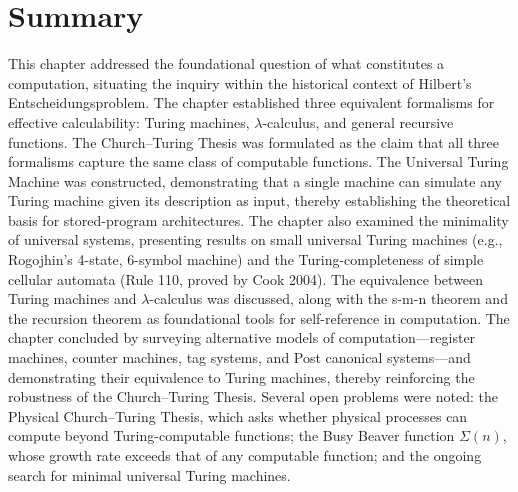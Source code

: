 \section{Summary}
\label{sec:computation:summary}

This chapter addressed the foundational question of what constitutes a computation, situating the inquiry within the historical context of Hilbert's Entscheidungsproblem. The chapter established three equivalent formalisms for effective calculability: Turing machines, $\lambda$-calculus, and general recursive functions. The Church--Turing Thesis was formulated as the claim that all three formalisms capture the same class of computable functions. The Universal Turing Machine was constructed, demonstrating that a single machine can simulate any Turing machine given its description as input, thereby establishing the theoretical basis for stored-program architectures. The chapter also examined the minimality of universal systems, presenting results on small universal Turing machines (e.g., Rogojhin's 4-state, 6-symbol machine) and the Turing-completeness of simple cellular automata (Rule 110, proved by Cook 2004). The equivalence between Turing machines and $\lambda$-calculus was discussed, along with the s-m-n theorem and the recursion theorem as foundational tools for self-reference in computation. The chapter concluded by surveying alternative models of computation---register machines, counter machines, tag systems, and Post canonical systems---and demonstrating their equivalence to Turing machines, thereby reinforcing the robustness of the Church--Turing Thesis. Several open problems were noted: the Physical Church--Turing Thesis, which asks whether physical processes can compute beyond Turing-computable functions; the Busy Beaver function $\Sigma(n)$, whose growth rate exceeds that of any computable function; and the ongoing search for minimal universal Turing machines.

